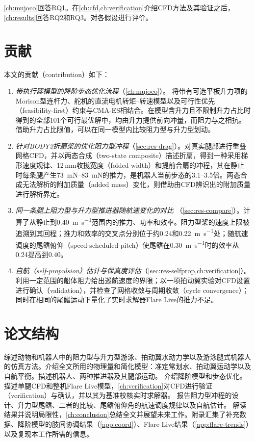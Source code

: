 \cref{ch:mujoco}回答RQ1。在\cref{ch:cfd,ch:verification}介绍CFD方法及其验证之后，\cref{ch:results}回答RQ2和RQ3。对各假设进行评价。

\section{贡献}

本文的贡献（contribution）如下：
\begin{enumerate}
  \item \emph{带执行器模型的降阶步态优化流程}（\cref{ch:mujoco}）。
        将带有可选平板升力项的Morison型连杆力、舵机的直流电机转矩--转速模型以及可行性优先（feasibility-first）约束与CMA-ES相结合。在模型含升力且不限制升力占比时得到的全部101个可行最优解中，均由升力提供前向冲量，而阻力与之相抗。借助升力占比限值，可以在同一模型内比较阻力型与升力型划动。
  \item \emph{针对BODY2折扇桨的优化阻力型冲程}（\cref{sec:res-drag}）。对真实腿部进行重叠网格CFD，并以两态合成（two-state composite）描述折扇，得到一种采用梯形速度规律、12\,mm收拢宽度（folded width）和提前合扇的冲程，其在静止时每条腿产生\SIrange{73}{83}{\milli\newton}的推力，是机器人当前步态的3.1--3.5倍。两态合成无法解析的附加质量（added mass）变化，则借助由CFD辨识出的附加质量进行解析界定。
  \item \emph{同一条腿上阻力型与升力型推进器随航速变化的对比}
        （\cref{sec:res-compare}）。计算了从静止到\SI{0.40}{\metre\per\second}范围内的推力、功率和效率。阻力型桨的速度上限被追溯到其回程；推力和效率的交叉点分别位于约\SI{0.24}{}和\SI{0.22}{\metre\per\second}处；随航速调度的尾鳍俯仰（speed-scheduled pitch）使尾鳍在\SI{0.30}{\metre\per\second}时的效率从0.24提高到0.40。
  \item \emph{自航（self-propulsion）估计与保真度评估}（\cref{sec:res-selfprop,ch:verification}）。
        利用一定范围的船体阻力给出巡航速度的界限；以一项拍动翼实验对CFD设置进行确认（validation），并检查了网格收敛与周期收敛（cycle convergence）；同时在相同的尾鳍运动下量化了实时求解器Flare Live的推力不足。
\end{enumerate}

\section{论文结构}

综述动物和机器人中的阻力型与升力型游泳、拍动翼水动力学以及游泳腿式机器人的仿真方法。介绍全文所用的物理量和简化模型：准定常划水、拍动翼运动学以及自航平衡。描述机器人、两种推进器及其腿部运动。
介绍降阶模型和步态优化。描述单腿CFD和整机Flare Live模型，\cref{ch:verification}对CFD进行验证（verification）与确认，并以其为基准校核实时求解器。
报告阻力型冲程的设计、升力型尾鳍、二者的比较、尾鳍俯仰角的航速调度规律以及自航估计。
解读结果并说明局限性，\cref{ch:conclusion}总结全文并展望未来工作。附录汇集了补充数据、降阶模型的肢间协调结果（\cref{app:coord}）、Flare Live结果（\cref{app:flare-trends}）以及复现本工作所需的信息。
